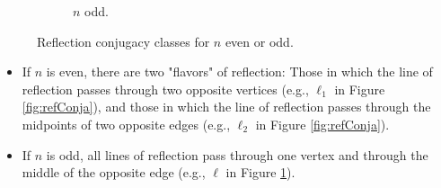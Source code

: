 \documentclass[../notes.tex]{subfiles}
\begin{document}
\begin{itemize}
\begin{figure}[h!]
\begin{subfigure}[b]{0.3\linewidth}
            \caption{$n$ odd.}
            \label{fig:refConjb}
        \end{subfigure}
        \caption{Reflection conjugacy classes for $n$ even or odd.}
        \label{fig:refConj}
    \end{figure}
    \begin{itemize}
        \item If $n$ is even, there are two "flavors" of reflection: Those in which the line of reflection passes through two opposite vertices (e.g., $\ell_1$ in Figure \ref{fig:refConja}), and those in which the line of reflection passes through the midpoints of two opposite edges (e.g., $\ell_2$ in Figure \ref{fig:refConja}).
        \item If $n$ is odd, all lines of reflection pass through one vertex and through the middle of the opposite edge (e.g., $\ell$ in Figure \ref{fig:refConjb}).
    \end{itemize}
\end{itemize}
\end{document}
